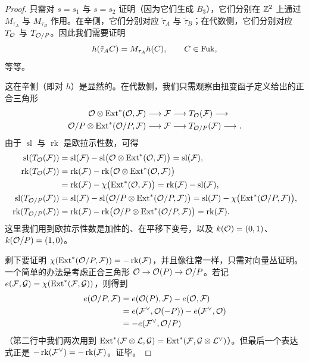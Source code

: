 \begin{proof}
只需对 $s=s_1$ 与 $s=s_2$ 证明（因为它们生成 $B_3$），它们分别在 $\mathbb{Z}^2$ 上通过 $M_{\tau_A}$ 与 $M_{\tau_B}$ 作用。在辛侧，它们分别对应 $\tilde{\tau}_A$ 与 $\tilde{\tau}_B$；在代数侧，它们分别对应 $T_{\mathcal{O}}$ 与 $T_{\mathcal{O}/P}$。因此我们需要证明
\[
h(\tilde{\tau}_AC)=M_{\tau_A}h(C),\qquad C\in\operatorname{Fuk},
\]
等等。

这在辛侧（即对 $h$）是显然的。在代数侧，我们只需观察由扭变函子定义给出的正合三角形
\[
\begin{aligned}
\mathcal{O}\otimes\operatorname{Ext}^*(\mathcal{O},\mathcal{F})&\longrightarrow\mathcal{F}\longrightarrow T_{\mathcal{O}}(\mathcal{F})\longrightarrow\\
\mathcal{O}/P\otimes\operatorname{Ext}^*(\mathcal{O}/P,\mathcal{F})&\longrightarrow\mathcal{F}\longrightarrow T_{\mathcal{O}/P}(\mathcal{F})\longrightarrow .
\end{aligned}
\]
由于 $\operatorname{sl}$ 与 $\operatorname{rk}$ 是欧拉示性数，可得
\[
\begin{aligned}
\operatorname{sl}(T_{\mathcal{O}}(\mathcal{F}))
&=\operatorname{sl}(\mathcal{F})-\operatorname{sl}\bigl(\mathcal{O}\otimes\operatorname{Ext}^*(\mathcal{O},\mathcal{F})\bigr)
=\operatorname{sl}(\mathcal{F}),\\
\operatorname{rk}(T_{\mathcal{O}}(\mathcal{F}))
&=\operatorname{rk}(\mathcal{F})-\operatorname{rk}\bigl(\mathcal{O}\otimes\operatorname{Ext}^*(\mathcal{O},\mathcal{F})\bigr)\\
&=\operatorname{rk}(\mathcal{F})-\chi\bigl(\operatorname{Ext}^*(\mathcal{O},\mathcal{F})\bigr)
=\operatorname{rk}(\mathcal{F})-\operatorname{sl}(\mathcal{F}),\\
\operatorname{sl}(T_{\mathcal{O}/P}(\mathcal{F}))
&=\operatorname{sl}(\mathcal{F})-\operatorname{sl}\bigl(\mathcal{O}/P\otimes\operatorname{Ext}^*(\mathcal{O}/P,\mathcal{F})\bigr)
=\operatorname{sl}(\mathcal{F})-\chi\bigl(\operatorname{Ext}^*(\mathcal{O}/P,\mathcal{F})\bigr),\\
\operatorname{rk}(T_{\mathcal{O}/P}(\mathcal{F}))
&=\operatorname{rk}(\mathcal{F})-\operatorname{rk}\bigl(\mathcal{O}/P\otimes\operatorname{Ext}^*(\mathcal{O}/P,\mathcal{F})\bigr)
=\operatorname{rk}(\mathcal{F}).
\end{aligned}
\]
这里我们用到欧拉示性数是加性的、在平移下变号，以及 $k(\mathcal{O})=(0,1)$、$k(\mathcal{O}/P)=(1,0)$。


剩下要证明 $\chi(\operatorname{Ext}^*(\mathcal{O}/P,\mathcal{F}))=-\operatorname{rk}(\mathcal{F})$，并且像往常一样，只需对向量丛证明。一个简单的办法是考虑正合三角形 $\mathcal{O}\to\mathcal{O}(P)\to\mathcal{O}/P$。若记 $e(\mathcal{F},\mathcal{G})=\chi(\operatorname{Ext}^*(\mathcal{F},\mathcal{G}))$，则得到
\[
\begin{aligned}
e(\mathcal{O}/P,\mathcal{F})
&=e(\mathcal{O}(P),\mathcal{F})-e(\mathcal{O},\mathcal{F})\\
&=e(\mathcal{F}^\vee,\mathcal{O}(-P))-e(\mathcal{F}^\vee,\mathcal{O})\\
&=-e(\mathcal{F}^\vee,\mathcal{O}/P)
\end{aligned}
\]
（第二行中我们两次用到 $\operatorname{Ext}^*(\mathcal{F}\otimes\mathcal{L},\mathcal{G})=\operatorname{Ext}^*(\mathcal{F},\mathcal{G}\otimes\mathcal{L}^\vee)$）。但最后一个表达式正是 $-\operatorname{rk}(\mathcal{F}^\vee)=-\operatorname{rk}(\mathcal{F})$。证毕。
\end{proof}

